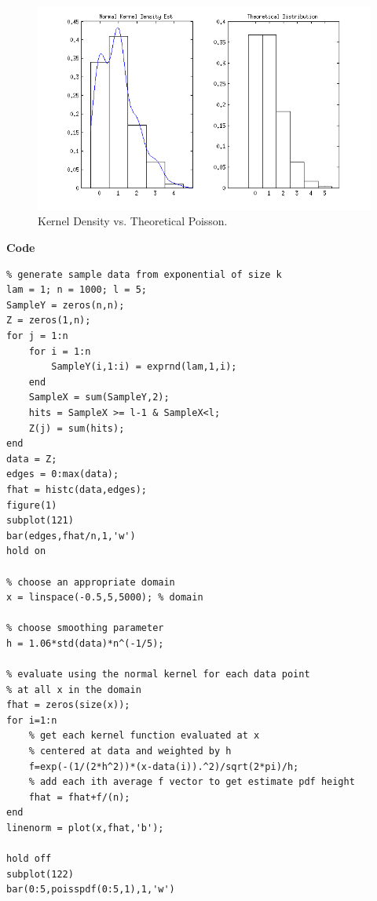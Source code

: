 \documentclass[12pt,a4paper]{article}
\begin{document}
\begin{figure}[ht!] 
\begin{center}
\includegraphics[scale=.9]{q2graph3.png}
\caption{Kernel Density vs. Theoretical Poisson.}
\label{q2fig3}
\end{center}
\end{figure}
\FloatBarrier
\clearpage
\textbf{Code}
\begin{verbatim}
% generate sample data from exponential of size k
lam = 1; n = 1000; l = 5;
SampleY = zeros(n,n);
Z = zeros(1,n);
for j = 1:n
    for i = 1:n
        SampleY(i,1:i) = exprnd(lam,1,i);
    end
    SampleX = sum(SampleY,2);
    hits = SampleX >= l-1 & SampleX<l;
    Z(j) = sum(hits);
end
data = Z;
edges = 0:max(data);
fhat = histc(data,edges);
figure(1)
subplot(121)
bar(edges,fhat/n,1,'w')
hold on

% choose an appropriate domain
x = linspace(-0.5,5,5000); % domain

% choose smoothing parameter
h = 1.06*std(data)*n^(-1/5); 

% evaluate using the normal kernel for each data point 
% at all x in the domain
fhat = zeros(size(x));
for i=1:n
    % get each kernel function evaluated at x
    % centered at data and weighted by h
    f=exp(-(1/(2*h^2))*(x-data(i)).^2)/sqrt(2*pi)/h;
    % add each ith average f vector to get estimate pdf height
    fhat = fhat+f/(n);
end
linenorm = plot(x,fhat,'b');

hold off
subplot(122)
bar(0:5,poisspdf(0:5,1),1,'w')

\end{verbatim}
\clearpage
\end{document}
